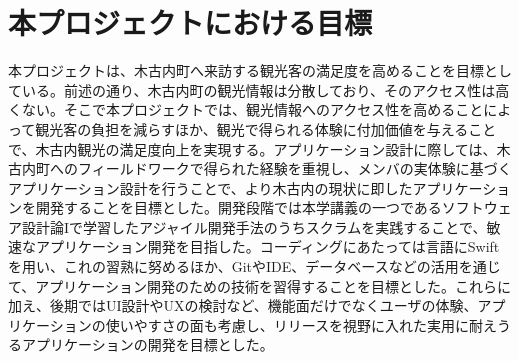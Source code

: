 \section{本プロジェクトにおける目標}
本プロジェクトは、木古内町へ来訪する観光客の満足度を高めることを目標としている。前述の通り、木古内町の観光情報は分散しており、そのアクセス性は高くない。そこで本プロジェクトでは、観光情報へのアクセス性を高めることによって観光客の負担を減らすほか、観光で得られる体験に付加価値を与えることで、木古内観光の満足度向上を実現する。アプリケーション設計に際しては、木古内町へのフィールドワークで得られた経験を重視し、メンバの実体験に基づくアプリケーション設計を行うことで、より木古内の現状に即したアプリケーションを開発することを目標とした。開発段階では本学講義の一つであるソフトウェア設計論Iで学習したアジャイル開発手法のうちスクラムを実践することで、敏速なアプリケーション開発を目指した。コーディングにあたっては言語にSwiftを用い、これの習熟に努めるほか、GitやIDE、データベースなどの活用を通じて、アプリケーション開発のための技術を習得することを目標とした。これらに加え、後期ではUI設計やUXの検討など、機能面だけでなくユーザの体験、アプリケーションの使いやすさの面も考慮し、リリースを視野に入れた実用に耐えうるアプリケーションの開発を目標とした。
